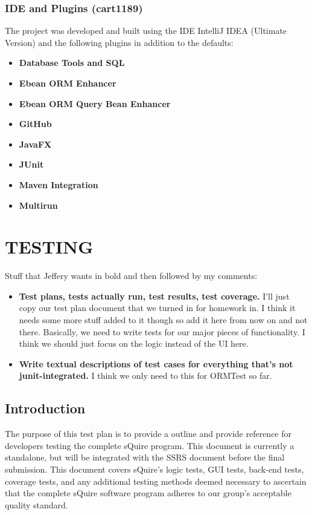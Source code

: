 \documentclass[twoside,letterpaper]{article}
\begin{document}
\newpage
\subsubsection{IDE and Plugins (cart1189)}
The project was developed and built using the IDE IntelliJ IDEA (Ultimate Version) and the following plugins in addition to the defaults:
\begin{itemize}
	\item \textbf{Database Tools and SQL}
	\item \textbf{Ebean ORM Enhancer}
	\item \textbf{Ebean ORM Query Bean Enhancer}
	\item \textbf{GitHub}
	\item \textbf{JavaFX}
	\item \textbf{JUnit}
	\item \textbf{Maven Integration}
	\item \textbf{Multirun}

\end{itemize}


\newpage
\section[Testing]{\rmfamily\bfseries\color{black} TESTING}


Stuff that Jeffery wants in bold and then followed by my comments:

\begin{itemize}
	\item \textbf{Test plans, tests actually run, test results, test coverage.} I'll just copy our test plan document that we turned in for homework in. I think it needs some more stuff added to it though so add it here from now on and not there. Basically, we need to write tests for our major pieces of functionality. I think we should just focus on the logic instead of the UI here.
	\item \textbf{Write textual descriptions of test cases for everything that's not junit-integrated.} I think we only need to this for ORMTest so far.
\end{itemize}


\subsection{Introduction}

The purpose of this test plan is to provide a outline and provide reference for developers testing the complete sQuire program. This document is currently a standalone, but will be integrated with the SSRS document before the final submission. This document covers sQuire's logic tests, GUI tests, back-end tests, coverage tests, and any additional testing methods deemed necessary to ascertain that the complete sQuire software program adheres to our group's acceptable quality standard.
\end{document}
